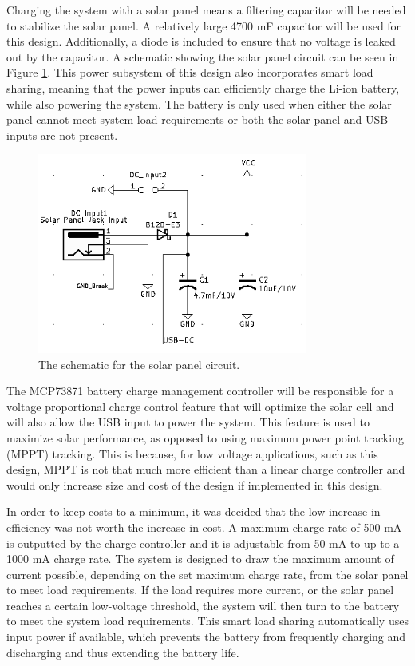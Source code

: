 \documentclass[conference]{IEEEtran}
\begin{document}
Charging the system with a solar panel means a filtering capacitor will be needed to stabilize the solar panel. A relatively large 4700 mF capacitor will be used for this design. Additionally, a diode is included to ensure that no voltage is leaked out by the capacitor. A schematic showing the solar panel circuit can be seen in Figure \ref{fig:Solar_Panel}. This power subsystem of this design also incorporates smart load sharing, meaning that the power inputs can efficiently charge the Li-ion battery, while also powering the system. The battery is only used when either the solar panel cannot meet system load requirements or both the solar panel and USB inputs are not present.

\begin{figure}[b]
    \centering
    \includegraphics[width=3.5in]{img/Solar_Panel.PNG}
    \caption{The schematic for the solar panel circuit.}
    \label{fig:Solar_Panel}
\end{figure}


The MCP73871 battery charge management controller will be responsible for a voltage proportional charge control feature that will optimize the solar cell and will also allow the USB input to power the system. This feature is used to maximize solar performance, as opposed to using maximum power point tracking (MPPT) tracking. This is because, for low voltage applications, such as this design, MPPT is not that much more efficient than a linear charge controller and would only increase size and cost of the design if implemented in this design. 

In order to keep costs to a minimum, it was decided that the low increase in efficiency was not worth the increase in cost. A maximum charge rate of 500 mA is outputted by the charge controller and it is adjustable from 50 mA to up to a 1000 mA charge rate. The system is designed to draw the maximum amount of current possible, depending on the set maximum charge rate, from the solar panel to meet load requirements. If the load requires more current, or the solar panel reaches a certain low-voltage threshold, the system will then turn to the battery to meet the system load requirements. This smart load sharing automatically uses input power if available, which prevents the battery from frequently charging and discharging and thus extending the battery life. 
\end{document}
